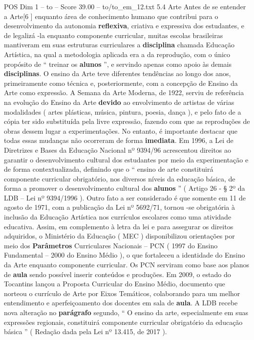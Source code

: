 \begin{textsample}{POS Dim 1 – to – Score 39.00 – to/to\_em\_12.txt}  \label{ex:f1_pos_259}
5.4 Arte Antes de se entender a Arte[6 ] enquanto área de conhecimento humano que contribui para o desenvolvimento da autonomia \textbf{reflexiva}, criativa e expressiva dos estudantes, e de legalizá -la enquanto componente curricular, muitas escolas brasileiras mantiveram em suas estruturas curriculares a \textbf{disciplina} chamada Educação Artística, na qual a metodologia aplicada era a da reprodução, com o único propósito de “ treinar os \textbf{alunos} ”, e servindo apenas como apoio às demais \textbf{disciplinas}.
O ensino da Arte teve diferentes tendências ao longo dos anos, primeiramente como técnica e, posteriormente, com a concepção de Ensino da Arte como expressão.
A Semana da Arte Moderna, de 1922, serviu de referência na evolução do Ensino da Arte \textbf{devido} ao envolvimento de artistas de várias modalidades ( artes plásticas, música, pintura, poesia, dança ), e pelo fato de a cópia ter sido substituída pela livre expressão, fazendo com que as reproduções de obras dessem lugar a experimentações.
No entanto, é importante destacar que todas essas mudanças não ocorreram de forma \textbf{imediata}.
Em 1996, a Lei de Diretrizes e Bases da Educação Nacional nº 9394/96 acrescentou direitos ao garantir o desenvolvimento cultural dos estudantes por meio da experimentação e de forma contextualizada, definindo que o “ ensino de arte constituirá componente curricular obrigatório, nos diversos níveis da educação básica, de forma a promover o desenvolvimento cultural dos \textbf{alunos} ” ( Artigo 26 - § 2º da LDB – Lei nº 9394/1996 ).
Outro fato a ser considerado é que somente em 11 de agosto de 1971, com a publicação da Lei nº 5692/71, tornou -se obrigatória à inclusão da Educação Artística nos currículos escolares como uma atividade educativa.
Assim, em complemento à letra da lei e para assegurar os direitos adquiridos, o Ministério da Educação ( MEC ) disponibilizou orientações por meio dos \textbf{Parâmetros} Curriculares Nacionais – PCN ( 1997 do Ensino Fundamental – 2000 do Ensino Médio ), o que fortaleceu a identidade do Ensino da Arte enquanto componente curricular.
Os PCN serviram como base aos planos de \textbf{aula} sendo possível inserir conteúdos e produções.
Em 2009, o estado do Tocantins lançou a Proposta Curricular do Ensino Médio, documento que norteou o currículo de Arte por Eixos Temáticos, colaborando para um melhor entendimento e aperfeiçoamento dos docentes em sala de \textbf{aula}.
A LDB recebe nova alteração no \textbf{parágrafo} segundo, “ O ensino da arte, especialmente em suas expressões regionais, constituirá componente curricular obrigatório da educação básica ” ( Redação dada pela Lei nº 13.415, de 2017 ).

\end{textsample}
